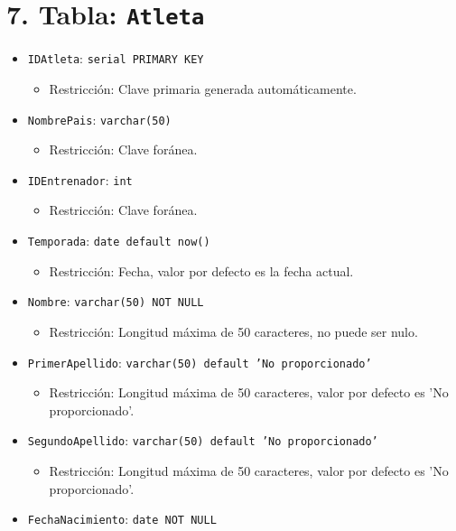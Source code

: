 \section*{7. Tabla: \texttt{Atleta}}
\begin{itemize}
    \item \texttt{IDAtleta}: \texttt{serial PRIMARY KEY}
    \begin{itemize}
        \item Restricción: Clave primaria generada automáticamente.
    \end{itemize}
    \item \texttt{NombrePais}: \texttt{varchar(50)}
    \begin{itemize}
        \item Restricción: Clave foránea.
    \end{itemize}
    \item \texttt{IDEntrenador}: \texttt{int}
    \begin{itemize}
        \item Restricción: Clave foránea.
    \end{itemize}
    \item \texttt{Temporada}: \texttt{date default now()}
    \begin{itemize}
        \item Restricción: Fecha, valor por defecto es la fecha actual.
    \end{itemize}
    \item \texttt{Nombre}: \texttt{varchar(50) NOT NULL}
    \begin{itemize}
        \item Restricción: Longitud máxima de 50 caracteres, no puede ser nulo.
    \end{itemize}
    \item \texttt{PrimerApellido}: \texttt{varchar(50) default 'No proporcionado'}
    \begin{itemize}
        \item Restricción: Longitud máxima de 50 caracteres, valor por defecto es 'No proporcionado'.
    \end{itemize}
    \item \texttt{SegundoApellido}: \texttt{varchar(50) default 'No proporcionado'}
    \begin{itemize}
        \item Restricción: Longitud máxima de 50 caracteres, valor por defecto es 'No proporcionado'.
    \end{itemize}
    \item \texttt{FechaNacimiento}: \texttt{date NOT NULL}

\end{itemize}
